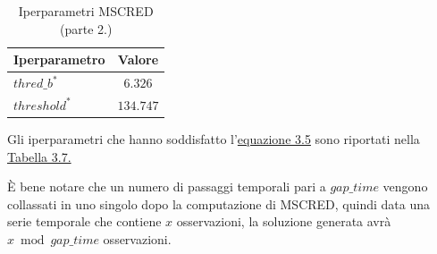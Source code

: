     \begin{table}[H]
        \centering
        \caption{Iperparametri MSCRED (parte 2.)}
        \begin{tabular}{lc}
            \toprule
            \textbf{Iperparametro} & \textbf{Valore} \\
            \toprule
            $thred\_b^*$ & $6.326$ \\
            $threshold^*$ & $134.747$ \\
            \bottomrule
        \end{tabular}
        \label{tab:mscred-iperparams2}
    \end{table}
    Gli iperparametri che hanno soddisfatto l'\hyperref[eq:mscred-problem]{equazione 3.5} sono riportati nella 
    \hyperref[tab:mscred-iperparams2]{Tabella 3.7.}

    È bene notare che un numero di passaggi temporali pari a $gap\_time$ vengono collassati in uno singolo dopo la computazione di MSCRED,
    quindi data una serie temporale che contiene $x$ osservazioni, la soluzione generata avrà $x \bmod gap\_time$ osservazioni.